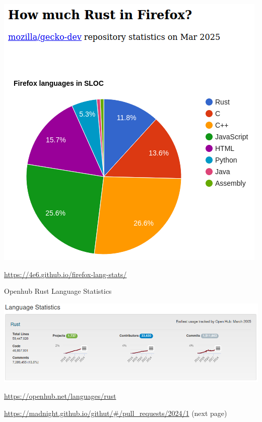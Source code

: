 \documentclass{beamer}
\begin{document}
\begin{frame}{} 
\begin{center}
\includegraphics[scale=0.45]{rust-in-firefox}
\end{center}
\url{https://4e6.github.io/firefox-lang-stats/}
\end{frame} 

\begin{frame}{Openhub Rust Language Statistics} 

\begin{center}
\includegraphics[scale=0.4]{openhub-statistics}
\end{center}

\url{https://openhub.net/languages/rust}


\url{https://madnight.github.io/githut/\#/pull_requests/2024/1}
(next page)

\end{frame} 
\end{document}
